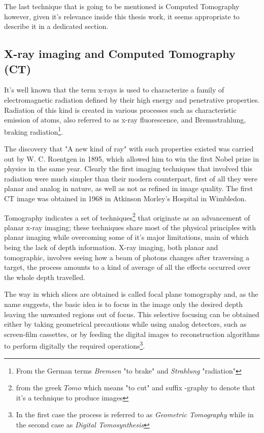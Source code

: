 The last technique that is going to be mentioned is Computed Tomography however, given it's relevance inside this thesis work, it seems appropriate to describe it in a dedicated section.

\subsection{X-ray imaging and Computed Tomography (CT)}
It's well known that the term x-rays is used to characterize a family of electromagnetic radiation defined by their high energy and penetrative properties. Radiation of this kind is created in various processes such as characteristic emission of atoms, also referred to as x-ray fluorescence, and Bremsstrahlung, braking radiation\footnote{From the German terms \textit{Bremsen} "to brake" and \textit{Strahlung} "radiation"}. 

The discovery that "A new kind of ray"\cite{Roentgen} with such properties existed was carried out by W. C. Roentgen in 1895, which allowed him to win the first Nobel prize in physics in the same year. 
Clearly the first imaging techniques that involved this radiation were much simpler than their modern counterpart, first of all they were planar and analog in nature, as well as not as refined in image quality. The first CT image was obtained in 1968 in Atkinson Morley's Hospital in Wimbledon. 

Tomography indicates a set of techniques\footnote{from the greek $\textit{Tomo}$ which means "to cut" and suffix -graphy to denote that it's a technique to produce images} that originate as an advancement of planar x-ray imaging; these techniques share most of the physical principles with planar imaging while overcoming some of it's major limitations, main of which being the lack of depth information.  X-ray imaging, both planar and tomographic, involves seeing how a beam of photons changes after traversing a target, the process amounts to a kind of average of all the effects occurred over the whole depth travelled.

The way in which slices are obtained is called focal plane tomography and, as the name suggests, the basic idea is to focus in the image only the desired depth leaving the unwanted regions out of focus. This selective focusing can be obtained either by taking geometrical precautions while using analog detectors, such as screen-film cassettes, or by feeding the digital images to reconstruction algorithms to perform digitally the required operations\footnote{In the first case the process is referred to as \textit{Geometric Tomography} while in the second case as \textit{Digital Tomosynthesis}}.

